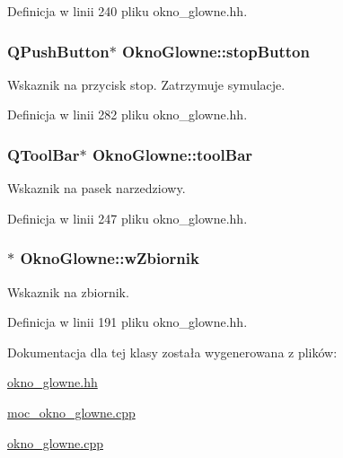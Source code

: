 Definicja w linii 240 pliku okno\-\_\-glowne.\-hh.

\hypertarget{class_okno_glowne_a3051d73dc0e0a27dc30ada43cc6b63c4}{
\subsubsection[{stop\-Button}]{\setlength{\rightskip}{0pt plus 5cm}Q\-Push\-Button$\ast$ Okno\-Glowne\-::stop\-Button\hspace{0.3cm}{\ttfamily [private]}}}\label{class_okno_glowne_a3051d73dc0e0a27dc30ada43cc6b63c4}
Wskaznik na przycisk stop. Zatrzymuje symulacje. 

Definicja w linii 282 pliku okno\-\_\-glowne.\-hh.

\hypertarget{class_okno_glowne_a6a37dd1f32605092fff7feac712bf429}{
\subsubsection[{tool\-Bar}]{\setlength{\rightskip}{0pt plus 5cm}Q\-Tool\-Bar$\ast$ Okno\-Glowne\-::tool\-Bar\hspace{0.3cm}{\ttfamily [private]}}}\label{class_okno_glowne_a6a37dd1f32605092fff7feac712bf429}
Wskaznik na pasek narzedziowy. 

Definicja w linii 247 pliku okno\-\_\-glowne.\-hh.

\hypertarget{class_okno_glowne_af2d1275209898ebdd5ab9de8ef78dffd}{
\subsubsection[{w\-Zbiornik}]{$\ast$ Okno\-Glowne\-::w\-Zbiornik\hspace{0.3cm}{\ttfamily [private]}}}\label{class_okno_glowne_af2d1275209898ebdd5ab9de8ef78dffd}
Wskaznik na zbiornik. 

Definicja w linii 191 pliku okno\-\_\-glowne.\-hh.



Dokumentacja dla tej klasy została wygenerowana z plików\-:\begin{DoxyCompactItemize}
\item 
\hyperlink{okno__glowne_8hh}{okno\-\_\-glowne.\-hh}\item 
\hyperlink{moc__okno__glowne_8cpp}{moc\-\_\-okno\-\_\-glowne.\-cpp}\item 
\hyperlink{okno__glowne_8cpp}{okno\-\_\-glowne.\-cpp}\end{DoxyCompactItemize}
